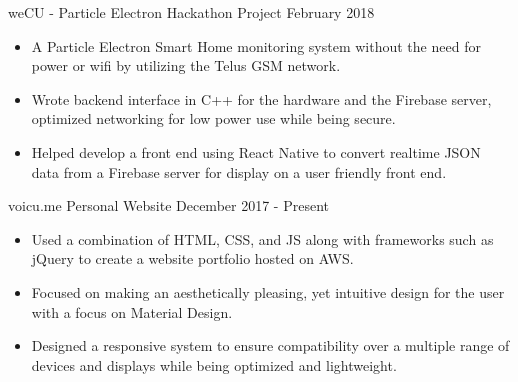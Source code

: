 \documentclass[10pt,a4paper]{altacv}
\begin{document}
\divider

%

\cvproject
	{weCU - Particle Electron}
    {Hackathon Project}
    {February 2018}
\begin{itemize}
	\item {A Particle Electron Smart Home monitoring system without the need for power or wifi by utilizing the Telus GSM network.}
	\item {Wrote backend interface in C++ for the hardware and the Firebase server, optimized networking for low power use while being secure.}
	\item {Helped develop a front end using React Native to convert realtime JSON data from a Firebase server for display on a user friendly front end.}
\end{itemize}

\divider

\cvproject
	{voicu.me}
    {Personal Website}
    {December 2017 - Present}
\begin{itemize}
	\item {Used a combination of HTML, CSS, and JS along with frameworks such as jQuery to create a website portfolio hosted on AWS.}
    \item {Focused on making an aesthetically pleasing, yet intuitive design for the user with a focus on Material Design.}
    \item {Designed a responsive system to ensure compatibility over a multiple range of devices and displays while being optimized and lightweight.}
\end{itemize}


\end{document}
